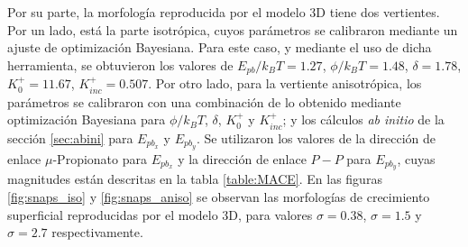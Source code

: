 \documentclass[12pt,letterpaper,oneside]{report}
\begin{document}
Por su parte, la morfología reproducida por el modelo 3D tiene dos vertientes. Por un lado, está la parte isotrópica, cuyos parámetros se calibraron mediante un ajuste de optimización Bayesiana. Para este caso, y mediante el uso de dicha herramienta, se obtuvieron los valores de $E_{pb}/k_BT = 1.27$, $\phi/k_BT = 1.48$, $\delta = 1.78$, $K_0^+ = 11.67$, $K_{inc}^+ = 0.507$. Por otro lado, para la vertiente anisotrópica, los parámetros se calibraron con una combinación de lo obtenido mediante optimización Bayesiana para $\phi/k_BT$, $\delta$, $K_0^+$ y $K_{inc}^+$; y los cálculos \textit{ab initio} de la sección \ref{sec:abini} para $E_{pb_x}$ y $E_{pb_y}$. Se utilizaron los valores de la dirección de enlace $\mu$-Propionato para $E_{pb_x}$ y la dirección de enlace $P-P$ para $E_{pb_y}$, cuyas magnitudes están descritas en la tabla \ref{table:MACE}. En las figuras \ref{fig:snaps_iso} y \ref{fig:snaps_aniso} se observan las morfologías de crecimiento superficial reproducidas por el modelo 3D, para valores $\sigma = 0.38$, $\sigma = 1.5$ y $\sigma = 2.7$ respectivamente.\\
\end{document}
